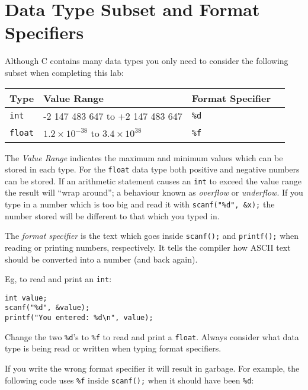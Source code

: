 \documentclass{lab}
\begin{document}
\pagebreak
\section{Data Type Subset and Format Specifiers}

Although C contains many data types you only need to consider the following subset when completing this lab:

\begin{table}[H]
\centering
\begin{tabular}{|l|l|l|l|}
\hline
Type &  Value Range   & Format Specifier         \\
\hline
\texttt{int}         & -2 147 483 647 to +2 147 483 647 & \texttt{\%d}\\
\texttt{float}   & $1.2\times 10^{-38}$ to $3.4 \times 10^{38}$ & \texttt{\%f}   \\
\hline
\end{tabular}
\end{table}

The \textit{Value Range} indicates the maximum and minimum values which can be stored in each type. For the  \texttt{float} data type both positive and negative numbers can be stored. If an arithmetic statement causes an \texttt{int} to exceed the value range the result will ``wrap around''; a behaviour known as \textit{overflow} or \textit{underflow}. If you type in a number which is too big and read it with \texttt{scanf("\%d", \&x);} the number stored will be different to that which you typed in.

The \textit{format specifier} is the text which goes inside \texttt{scanf();} and \texttt{printf();} when reading or printing numbers, respectively. It tells the compiler how ASCII text should be converted into a number (and back again).

Eg, to read and print an \texttt{int}:

\begin{lstlisting}[style=CStyle]
int value;
scanf("%d", &value);
printf("You entered: %d\n", value);
\end{lstlisting}

Change the two \texttt{\%d}'s to \texttt{\%f} to read and print a \texttt{float}. Always consider what data type is being read or written when typing format specifiers.

If you write the wrong format specifier it will result in garbage. For example, the following code uses \texttt{\%f} inside \texttt{scanf();} when it should have been \texttt{\%d}:
\end{document}

